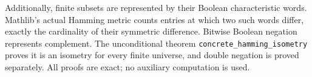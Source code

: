 \documentclass[10pt]{article}
\begin{document}
Additionally, finite subsets are represented by their Boolean
characteristic words. Mathlib's actual Hamming metric counts entries at
which two such words differ, exactly the cardinality of their symmetric
difference. Bitwise Boolean negation represents complement.
The unconditional theorem \texttt{concrete\_hamming\_isometry} proves
it is an isometry for every finite universe, and double negation is
proved separately. All proofs are exact; no auxiliary computation is used.
\end{document}
